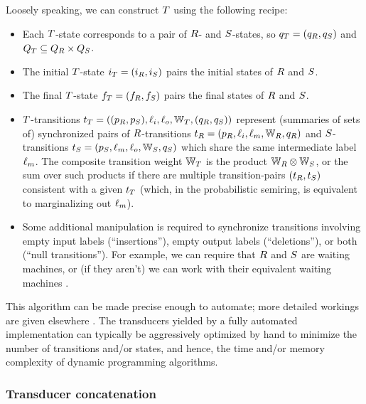 \documentclass[english]{article}
\begin{document}
Loosely speaking, we can construct $T$ using the following recipe:
\begin{itemize}
\item Each $T$-state corresponds to a pair of $R$- and $S$-states,
so $q_{T} = (q_{R}, q_{S})$
and $Q_{T} \subseteq Q_{R} \times Q_{S}$.
\item The initial $T$-state $i_{T}=(i_{R},i_{S})$ pairs the initial states of $R$ and $S$.
\item The final $T$-state $f_{T}=(f_{R},f_{S})$ pairs the final states of $R$ and $S$.
\item $T$-transitions
$t_{T} = ((p_{R},p_{S}),\ell_i,\ell_o,\mathbb{W}_{T},(q_{R},q_{S}))$
represent (summaries of sets of) synchronized pairs of $R$-transitions
$t_{R} = (p_{R},\ell_i,\ell_m,\mathbb{W}_{R},q_{R})$
and $S$-transitions
$t_{S} = (p_{S},\ell_m,\ell_o,\mathbb{W}_{S},q_{S})$
which share the same intermediate label $\ell_m$.
The composite transition weight $\mathbb{W}_{T}$ is the product $\mathbb{W}_{R} \otimes \mathbb{W}_{S}$,
or the sum over such products if there are multiple transition-pairs $(t_{R},t_{S})$
consistent with a given $t_{T}$
(which, in the probabilistic semiring, is equivalent to marginalizing out $\ell_m$).
\item Some additional manipulation is required to synchronize
transitions involving empty input labels (``insertions''),
empty output labels (``deletions''),
or both (``null transitions'').
For example, we can require that $R$ and $S$ are waiting machines,
or (if they aren't) we can work with their equivalent waiting machines \cite{WestessonEtAlArxiv2012}.
\end{itemize}

This algorithm can be made precise enough to automate;
more detailed workings are given elsewhere \cite{PereiraRiley1996,MohriPereiraRiley2000,Holmes2003,Holmes2007,WestessonEtAlArxiv2012,WestessonEtAl2012}.
The transducers yielded by a fully automated implementation can typically be aggressively optimized by hand
to minimize the number of transitions and/or states,
and hence,
the time and/or memory complexity of dynamic programming algorithms.

\subsubsection{Transducer concatenation}
\end{document}
